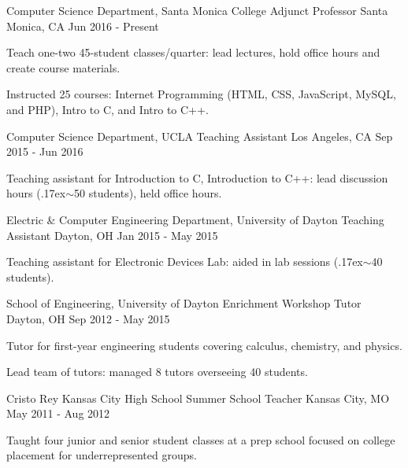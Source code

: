 


\begin{cventries}

\cventry
{Computer Science Department, Santa Monica College}
{Adjunct Professor}
{Santa Monica, CA}
{Jun 2016 - Present}
{
\begin{cvitems}
  \item Teach one-two 45-student classes/quarter: lead lectures, hold office hours and create course materials.
  \item Instructed 25 courses: Internet Programming (HTML, CSS, JavaScript, MySQL, and PHP), Intro to C, and Intro to C++.
\end{cvitems}
}


\cventry
{Computer Science Department, UCLA}
{Teaching Assistant}
{Los Angeles, CA}
{Sep 2015 - Jun 2016}
{
\begin{cvitems}
  \item Teaching assistant for Introduction to C, Introduction to C++: lead discussion hours ({\raise.17ex\hbox{$\scriptstyle\sim$}}50 students), held office hours.
\end{cvitems}
}

\cventry
{Electric \& Computer Engineering Department, University of Dayton}
{Teaching Assistant}
{Dayton, OH}
{Jan 2015 - May 2015}
{
\begin{cvitems}
  \item Teaching assistant for Electronic Devices Lab: aided in lab sessions ({\raise.17ex\hbox{$\scriptstyle\sim$}}40 students).
\end{cvitems}
}

\cventry
{School of Engineering, University of Dayton}
{Enrichment Workshop Tutor}
{Dayton, OH}
{Sep 2012 - May 2015}
{
\begin{cvitems}
  \item Tutor for first-year engineering students covering calculus, chemistry, and physics.
  \item Lead team of tutors: managed 8 tutors overseeing 40 students.
\end{cvitems}
}


\cventry
{Cristo Rey Kansas City High School}
{Summer School Teacher}
{Kansas City, MO}
{May 2011 - Aug 2012}
{
\begin{cvitems}
\item Taught four junior and senior student classes at a prep school focused on college placement for underrepresented groups.
\end{cvitems}
}

\end{cventries}
